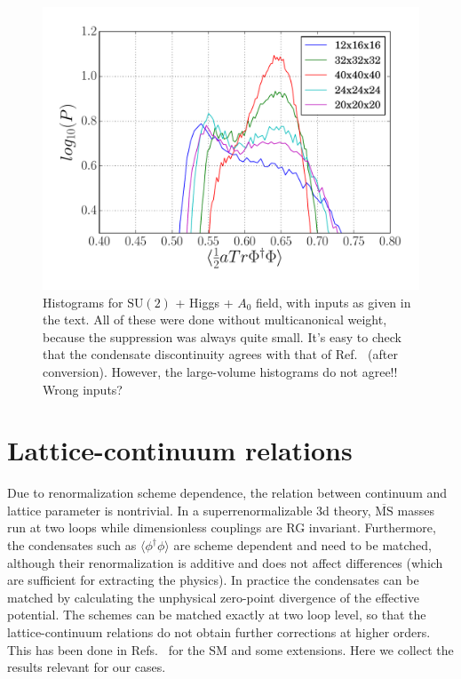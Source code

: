 \documentclass[11pt,a4paper]{article}
\newcommand\MSbar{$\overline{\text{MS}}$ } %
\newcommand\gr[1]{\mathrm{#1}}%
\newcommand\lauri[1]{{\color{myorange}#1}}
\begin{document}
\begin{figure}[H]
	\includegraphics[scale=0.5]{hgrams_SM+A0}
	\caption{Histograms for $\gr{SU(2)}$ + Higgs + $A_0$ field, with inputs as given in the text. All of these were done without multicanonical weight, because the suppression was always quite small. It's easy to check that the condensate discontinuity agrees with that of Ref.~\cite{Kajantie:1995kf} (after conversion). \lauri{However, the large-volume histograms do not agree!! Wrong inputs?}}
\label{fig:hgrams_SM_A0}
\end{figure}


\appendix 

\section{Lattice-continuum relations}
\label{sec:lat-cont}

Due to renormalization scheme dependence, the relation between continuum and lattice parameter is nontrivial. In a superrenormalizable 3d theory, \MSbar masses run at two loops while dimensionless couplings are RG invariant. Furthermore, the condensates such as $\langle \phi^\dagger\phi \rangle$ are scheme dependent and need to be matched, although their renormalization is additive and does not affect differences (which are sufficient for extracting the physics). In practice the condensates can be matched by calculating the unphysical zero-point divergence of the effective potential. The schemes can be matched exactly at two loop level, so that the lattice-continuum relations do not obtain further corrections at higher orders. This has been done in Refs.~\cite{Laine:1995np, Laine:1997dy} for the SM and some extensions. Here we collect the results relevant for our cases.
\end{document}
